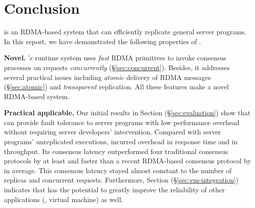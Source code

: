 \section{Conclusion} \label{sec:conclusion}

\xxx is an RDMA-based \paxos system that can efficiently replicate general 
server programs. In this report, we have demonstrated the following properties 
of \xxx.

\textbf{Novel.} \xxx's runtime system uses \emph{fast} RDMA primitives to 
invoke consensus processes on requests \emph{concurrently} 
(\S\ref{sec:concurrent}). Besides, it addresses several practical issues 
including \emph{atomic} delivery of RDMA messages (\S\ref{sec:atomic}) and  
\emph{transparent} replication. All these features make \xxx a novel RDMA-based 
\paxos system.

\textbf{Practical applicable.} Our initial results in Section 
(\S\ref{sec:evaluation}) show that \xxx can provide fault tolerance to server 
programs with low performance overhead without requiring server developers' 
intervention. Compared with \nprog server programs' unreplicated executions, 
\xxx incurred \latencyoverhead overhead in response time and \tputoverhead in 
throughput. Its consensus latency outperformed four traditional consensus 
protocols by at least \comptradlow and faster than a recent RDMA-based consensus 
protocol \dare by \fasterDARE in average. This consensus latency stayed almost 
constant  to the number of replicas and concurrent requests. Furthermore, 
Section (\S\ref{sec:vm-integration}) indicates that \xxx has the potential to 
greatly improve the reliability of other applications (\eg, virtual machine) as 
well.
